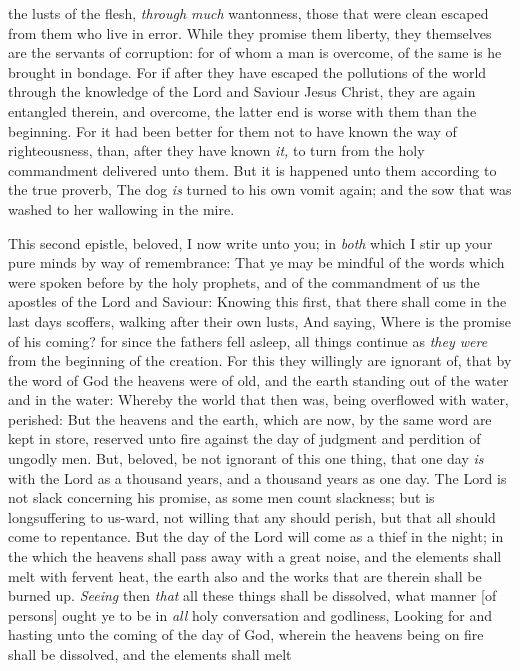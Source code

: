 \documentclass[11pt,letterpaper,oneside]{memoir}
\begin{document}
the lusts of the flesh, \emph{through much} wantonness, those that were
clean escaped from them who live in error. While they promise them
liberty, they themselves are the servants of corruption: for of whom a
man is overcome, of the same is he brought in bondage. For if after they
have escaped the pollutions of the world through the knowledge of the
Lord and Saviour Jesus Christ, they are again entangled therein, and
overcome, the latter end is worse with them than the beginning. For it
had been better for them not to have known the way of righteousness,
than, after they have known \emph{it,} to turn from the holy commandment
delivered unto them. But it is happened unto them according to the true
proverb, The dog \emph{is} turned to his own vomit again; and the sow
that was washed to her wallowing in the mire.

This second epistle, beloved, I now write unto you; in \emph{both} which
I stir up your pure minds by way of remembrance: That ye may be mindful
of the words which were spoken before by the holy prophets, and of the
commandment of us the apostles of the Lord and Saviour: Knowing this
first, that there shall come in the last days scoffers, walking after
their own lusts, And saying, Where is the promise of his coming? for
since the fathers fell asleep, all things continue as \emph{they were}
from the beginning of the creation. For this they willingly are ignorant
of, that by the word of God the heavens were of old, and the earth
standing out of the water and in the water: Whereby the world that then
was, being overflowed with water, perished: But the heavens and the
earth, which are now, by the same word are kept in store, reserved unto
fire against the day of judgment and perdition of ungodly men. But,
beloved, be not ignorant of this one thing, that one day \emph{is} with
the Lord as a thousand years, and a thousand years as one day. The Lord
is not slack concerning his promise, as some men count slackness; but is
longsuffering to us-ward, not willing that any should perish, but that
all should come to repentance. But the day of the Lord will come as a
thief in the night; in the which the heavens shall pass away with a
great noise, and the elements shall melt with fervent heat, the earth
also and the works that are therein shall be burned up. \emph{Seeing}
then \emph{that} all these things shall be dissolved, what manner [of
persons] ought ye to be in \emph{all} holy conversation and godliness,
Looking for and hasting unto the coming of the day of God, wherein the
heavens being on fire shall be dissolved, and the elements shall melt
\end{document}
